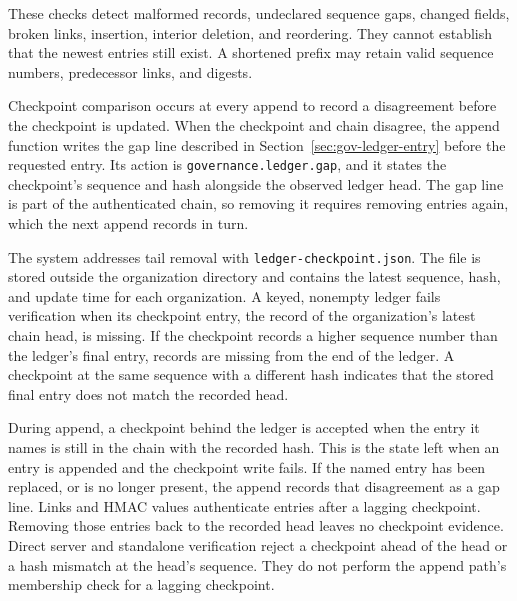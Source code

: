 These checks detect malformed records, {\color{red}undeclared} sequence gaps, changed fields, broken links, insertion, interior deletion, and reordering. They cannot establish that the newest entries still exist. A shortened prefix may retain valid sequence numbers, predecessor links, and digests.

{\color{red}Checkpoint comparison occurs at every append to record a
disagreement before the checkpoint is updated. When the checkpoint and chain
disagree, the append function writes the gap
line described in Section~\ref{sec:gov-ledger-entry} before the requested entry.
Its action is \texttt{governance.ledger.gap}, and it states the checkpoint's
sequence and hash alongside the observed ledger head. The gap line is part of the
authenticated chain, so removing it requires removing entries again, which the
next append records in turn.}

The system addresses tail removal with
\texttt{ledger-checkpoint.json}. The file is stored outside the organization directory and contains the latest sequence, hash, and update time for each organization. A keyed, nonempty ledger fails verification when its checkpoint entry,
the record of the organization's latest chain head, is missing. If the checkpoint records a higher sequence number than the ledger’s final entry, records are missing from the end of the ledger. A checkpoint at the same sequence with a different hash indicates that the stored final entry does not match the recorded head.

{\color{red}During append, a checkpoint behind the ledger is accepted when the entry it names is
still in the chain with the recorded hash. This is the state left when an entry
is appended and the checkpoint write fails. If the named entry has been
replaced, or is no longer present, the append records that disagreement as a
gap line. Links and HMAC values authenticate entries after a lagging checkpoint.
Removing those entries back to the recorded head leaves no checkpoint evidence.
Direct server and standalone verification reject a
checkpoint ahead of the head or a hash mismatch at the head's sequence. They
do not perform the append path's membership check for a lagging checkpoint.}

